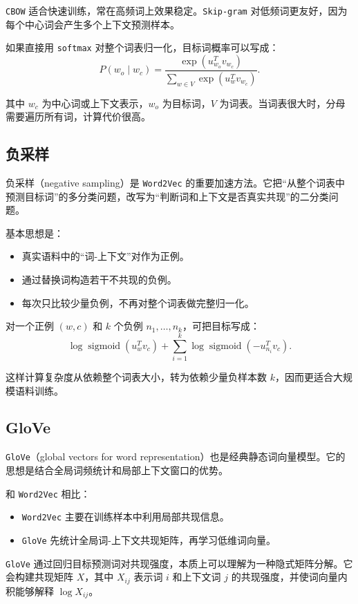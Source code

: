 \texttt{CBOW} 适合快速训练，常在高频词上效果稳定。\texttt{Skip-gram} 对低频词更友好，因为每个中心词会产生多个上下文预测样本。

如果直接用 \texttt{softmax} 对整个词表归一化，目标词概率可以写成：
\[
  P(w_o \mid w_c)
  =
  \frac{\exp(u_{w_o}^T v_{w_c})}
       {\sum_{w \in V} \exp(u_w^T v_{w_c})}.
\]

其中 $w_c$ 为中心词或上下文表示，$w_o$ 为目标词，$V$ 为词表。当词表很大时，分母需要遍历所有词，计算代价很高。

\subsection{负采样}

负采样（negative sampling）是 \texttt{Word2Vec} 的重要加速方法。它把“从整个词表中预测目标词”的多分类问题，改写为“判断词和上下文是否真实共现”的二分类问题。

基本思想是：
\begin{itemize}
  \item 真实语料中的“词-上下文”对作为正例。
  \item 通过替换词构造若干不共现的负例。
  \item 每次只比较少量负例，不再对整个词表做完整归一化。
\end{itemize}

对一个正例 $(w,c)$ 和 $k$ 个负例 $n_1,\dots,n_k$，可把目标写成：
\[
  \log \operatorname{sigmoid}(u_w^T v_c)
  + \sum_{i=1}^k \log \operatorname{sigmoid}(-u_{n_i}^T v_c).
\]

这样计算复杂度从依赖整个词表大小，转为依赖少量负样本数 $k$，因而更适合大规模语料训练。

\subsection{GloVe}

\texttt{GloVe}（global vectors for word representation）也是经典静态词向量模型。它的思想是结合全局词频统计和局部上下文窗口的优势。

和 \texttt{Word2Vec} 相比：
\begin{itemize}
  \item \texttt{Word2Vec} 主要在训练样本中利用局部共现信息。
  \item \texttt{GloVe} 先统计全局词-上下文共现矩阵，再学习低维词向量。
\end{itemize}

\texttt{GloVe} 通过回归目标预测词对共现强度，本质上可以理解为一种隐式矩阵分解。它会构建共现矩阵 $X$，其中 $X_{ij}$ 表示词 $i$ 和上下文词 $j$ 的共现强度，并使词向量内积能够解释 $\log X_{ij}$。

